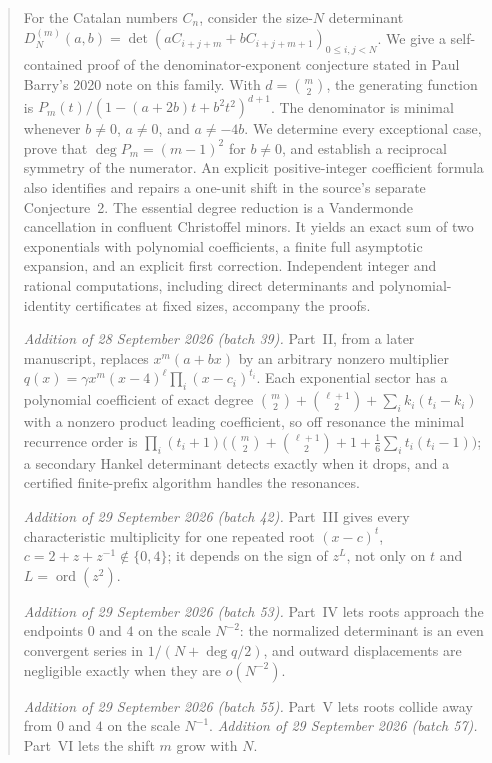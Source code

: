 \documentclass[11pt,a4paper]{article}
\numberwithin{equation}{section}
\theoremstyle{definition}
\theoremstyle{remark}
\newcommand{\ord}{\operatorname{ord}}
\begin{document}
\begin{abstract}
For the Catalan numbers $C_n$, consider the size-$N$ determinant
$D_N^{(m)}(a,b)=\det(aC_{i+j+m}+bC_{i+j+m+1})_{0\leq i,j<N}$.
We give a self-contained proof of the denominator-exponent conjecture stated
in Paul Barry's 2020 note on this family.  With $d=\binom m2$, the generating
function is $P_m(t)/(1-(a+2b)t+b^2t^2)^{d+1}$.  The denominator is minimal
whenever $b\ne0$, $a\ne0$, and $a\ne-4b$.  We determine every exceptional
case, prove that $\deg P_m=(m-1)^2$ for $b\ne0$, and establish a reciprocal
symmetry of the numerator.  An explicit positive-integer coefficient formula
also identifies and repairs a one-unit shift in the source's separate
Conjecture~2.  The essential degree reduction is a Vandermonde cancellation
in confluent Christoffel minors.  It yields an exact sum of two exponentials
with polynomial coefficients, a finite full asymptotic expansion, and an
explicit first correction.  Independent integer and rational computations,
including direct determinants and polynomial-identity certificates at fixed
sizes, accompany the proofs.

\emph{Addition of 28 September 2026 (batch 39).} Part~II, from a later
manuscript, replaces $x^m(a+bx)$ by an arbitrary nonzero multiplier
$q(x)=\gamma x^m(x-4)^\ell\prod_i(x-c_i)^{t_i}$.  Each exponential sector
has a polynomial coefficient of exact degree
$\binom m2+\binom{\ell+1}2+\sum_ik_i(t_i-k_i)$ with a nonzero product
leading coefficient, so off resonance the minimal recurrence order is
$\prod_i(t_i+1)\bigl(\binom m2+\binom{\ell+1}2+1+\frac16\sum_it_i(t_i-1)\bigr)$;
a secondary Hankel determinant detects exactly when it drops, and a
certified finite-prefix algorithm handles the resonances.

\emph{Addition of 29 September 2026 (batch 42).} Part~III gives every
characteristic multiplicity for one repeated root $(x-c)^t$,
$c=2+z+z^{-1}\notin\{0,4\}$; it depends on the sign of $z^L$, not only
on $t$ and $L=\ord(z^2)$.

\emph{Addition of 29 September 2026 (batch 53).} Part~IV lets roots
approach the endpoints $0$ and $4$ on the scale $N^{-2}$: the normalized
determinant is an even convergent series in $1/(N+\deg q/2)$, and outward
displacements are negligible exactly when they are $o(N^{-2})$.

\emph{Addition of 29 September 2026 (batch 55).} Part~V lets roots
collide away from $0$ and $4$ on the scale $N^{-1}$.
\emph{Addition of 29 September 2026 (batch 57).} Part~VI lets the shift
$m$ grow with $N$.
\end{abstract}
\end{document}
